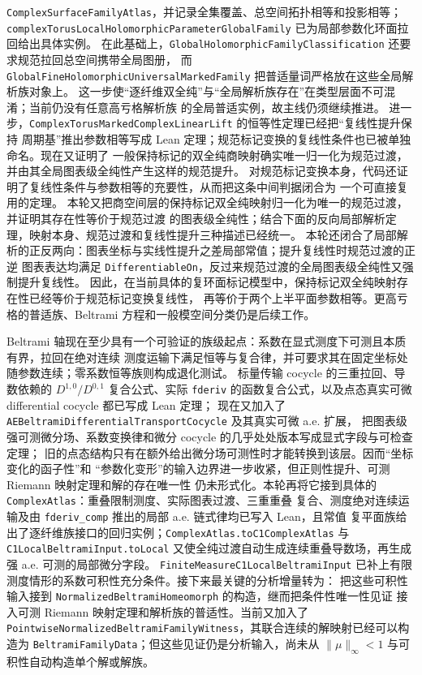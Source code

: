 \documentclass[UTF8,fontset=none,a4paper,11pt]{ctexart}
\begin{document}
\texttt{ComplexSurfaceFamily\allowbreak Atlas}，并记录全集覆盖、总空间拓扑相等和投影相等；
\texttt{complexTorusLocalHolomorphicParameter\allowbreak GlobalFamily} 已为局部参数化环面拉回给出具体实例。
在此基础上，\texttt{GlobalHolomorphicFamily\allowbreak Classification} 还要求规范拉回总空间携带全局图册，
而 \texttt{GlobalFineHolomorphicUniversal\allowbreak MarkedFamily} 把普适量词严格放在这些全局解析族对象上。
这一步使“逐纤维双全纯”与“全局解析族存在”在类型层面不可混淆；当前仍没有任意高亏格解析族
的全局普适实例，故主线仍须继续推进。
进一步，\texttt{ComplexTorusMarkedComplexLinearLift} 的恒等性定理已经把“复线性提升保持
周期基”推出参数相等写成 Lean 定理；规范标记变换的复线性条件也已被单独命名。现在又证明了
一般保持标记的双全纯商映射确实唯一归一化为规范过渡，并由其全局图表级全纯性产生这样的规范提升。
对规范标记变换本身，代码还证明了复线性条件与参数相等的充要性，从而把这条中间判据闭合为
一个可直接复用的定理。
本轮又把商空间层的保持标记双全纯映射归一化为唯一的规范过渡，并证明其存在性等价于规范过渡
的图表级全纯性；结合下面的反向局部解析定理，映射本身、规范过渡和复线性提升三种描述已经统一。
本轮还闭合了局部解析的正反两向：图表坐标与实线性提升之差局部常值；提升复线性时规范过渡的正逆
图表表达均满足 \texttt{DifferentiableOn}，反过来规范过渡的全局图表级全纯性又强制提升复线性。
因此，在当前具体的复环面标记模型中，保持标记双全纯映射存在性已经等价于规范标记变换复线性，
再等价于两个上半平面参数相等。更高亏格的普适族、Beltrami 方程和一般模空间分类仍是后续工作。

Beltrami 轴现在至少具有一个可验证的族级起点：系数在显式测度下可测且本质有界，拉回在绝对连续
测度运输下满足恒等与复合律，并可要求其在固定坐标处随参数连续；零系数恒等族则构成退化测试。
标量传输 cocycle 的三重拉回、导数依赖的 \(D^{1,0}/D^{0,1}\) 复合公式、实际
\texttt{fderiv} 的函数复合公式，以及点态真实可微 differential cocycle 都已写成 Lean 定理；
现在又加入了 \texttt{AEBeltramiDifferentialTransportCocycle} 及其真实可微 a.e. 扩展，
把图表级强可测微分场、系数变换律和微分 cocycle 的几乎处处版本写成显式字段与可检查定理；
旧的点态结构只有在额外给出微分场可测性时才能转换到该层。因而“坐标变化的函子性”和
“参数化变形”的输入边界进一步收紧，但正则性提升、可测 Riemann 映射定理和解的存在唯一性
仍未形式化。本轮再将它接到具体的 \texttt{ComplexAtlas}：重叠限制测度、实际图表过渡、三重重叠
复合、测度绝对连续运输及由 \texttt{fderiv\_comp} 推出的局部 a.e. 链式律均已写入 Lean，且常值
复平面族给出了逐纤维族接口的回归实例；\texttt{ComplexAtlas.toC1ComplexAtlas} 与
\texttt{C1LocalBeltramiInput.toLocal} 又使全纯过渡自动生成连续重叠导数场，再生成强 a.e. 可测的局部微分字段。
\texttt{FiniteMeasureC1LocalBeltramiInput} 已补上有限测度情形的系数可积性充分条件。接下来最关键的分析增量转为：
把这些可积性输入接到 \texttt{NormalizedBeltramiHomeomorph} 的构造，继而把条件性唯一性见证
接入可测 Riemann 映射定理和解析族的普适性。当前又加入了
\texttt{PointwiseNormalizedBeltramiFamilyWitness}，其联合连续的解映射已经可以构造为
\texttt{BeltramiFamilyData}；但这些见证仍是分析输入，尚未从
\(\|\mu\|_\infty<1\) 与可积性自动构造单个解或解族。
\end{document}
